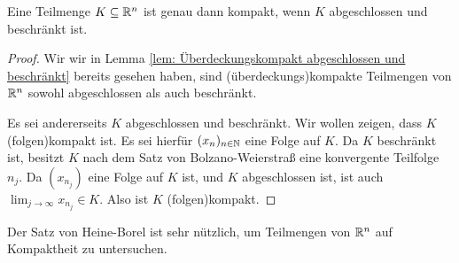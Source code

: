 \documentclass[a4paper,10pt]{article}
\begin{document}
\begin{thrm}
 Eine Teilmenge $K \subseteq \mathbb{R}^n$ ist genau dann kompakt, wenn $K$ abgeschlossen und beschränkt ist.
\end{thrm}
\begin{proof}
 Wir wir in Lemma \ref{lem: Überdeckungskompakt abgeschlossen und beschränkt} bereits gesehen haben, sind (über\-deck\-ungs)kom\-pak\-te Teilmengen von $\mathbb{R}^n$ sowohl abgeschlossen als auch beschränkt.
 
 Es sei andererseits $K$ abgeschlossen und beschränkt. Wir wollen zeigen, dass $K$ (folgen)kompakt ist. Es sei hierfür $(x_n)_{n \in \mathbb{N}}$ eine Folge auf $K$. Da $K$ beschränkt ist, besitzt $K$ nach dem Satz von Bolzano-Weierstraß eine konvergente Teilfolge $n_j$. Da $(x_{n_j})$ eine Folge auf $K$ ist, und $K$ abgeschlossen ist, ist auch $\lim_{j \to \infty} x_{n_j} \in K$. Also ist $K$ (folgen)kompakt.
\end{proof}


Der Satz von Heine-Borel ist sehr nützlich, um Teilmengen von $\mathbb{R}^n$ auf Kompaktheit zu untersuchen.
\end{document}
